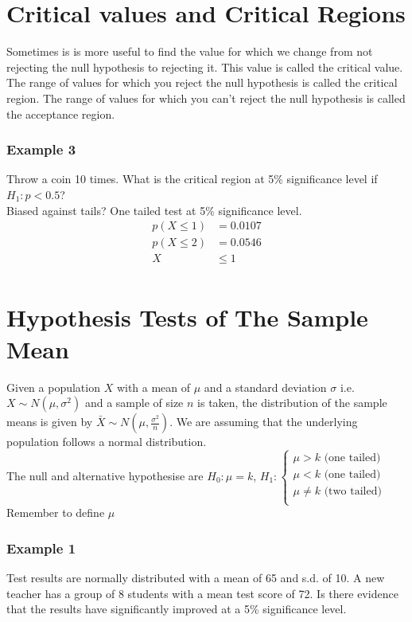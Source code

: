 \documentclass[class=article, crop=false]{standalone}
\begin{document}
\section*{Critical values and Critical Regions}
Sometimes is is more useful to find the value for which we change from not rejecting the null hypothesis to rejecting it. This value is called the critical value. \\
The range of values for which you reject the null hypothesis is called the critical region. The range of values for which you can't reject the null hypothesis is called the acceptance region. 
\subsubsection*{Example 3}
Throw a coin 10 times. What is the critical region at 5\% significance level if $H_1: p < 0.5$? \\
Biased against tails?
One tailed test at 5\% significance level.
\begin{align*}
p(X \leqslant 1) & = 0.0107 \\
p(X \leqslant 2) & = 0.0546 \\
X & \leqslant 1 \\
\end{align*}
\section*{Hypothesis Tests of The Sample Mean}
Given a population $X$ with a mean of $\mu$ and a standard deviation $\sigma$ i.e. $X \sim N(\mu, \sigma^2)$ and a sample of size $n$ is taken, the distribution of the sample means is given by $\bar{X} \sim N(\mu, \frac{\sigma^2}{n})$. We are assuming that the underlying population follows a normal distribution. \\

The null and alternative hypothesise are $H_0: \mu = k$, $H_1: \begin{cases} \mu > k \text{ (one tailed)} \\ \mu < k \text{ (one tailed)} \\ \mu \neq k \text{ (two tailed)} \\ \end{cases}$\\

Remember to define $\mu$
\subsubsection*{Example 1}
Test results are normally distributed with a mean of 65 and s.d. of 10. A new teacher has a group of 8 students with a mean test score of 72. Is there evidence that the results have significantly improved at a 5\% significance level. \\
\end{document}
